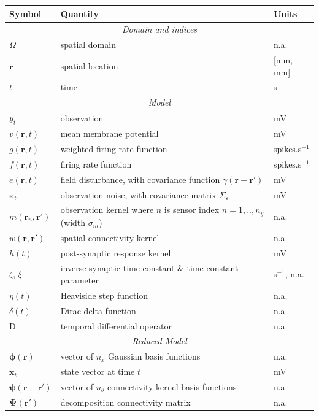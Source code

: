 \documentclass[review,authoryear,3p]{elsarticle}
\begin{document}
\begin{table}[!ht]
\begin{tabular}{|l|l|l|}
	\hline
	\textbf{Symbol} & \textbf{Quantity} & \textbf{Units}\\
	\hline
	\multicolumn{3}{|c|}{\emph{Domain and indices}}\\
	\hline
	$\Omega$ & spatial domain & n.a.\\
	$\mathbf{r}$ & spatial location & [mm, mm]\\
	$t$ & time & s\\
	\hline
	\multicolumn{3}{|c|}{\emph{Model}}\\
	\hline
    $y_t$ & observation & mV\\
    $v(\mathbf{r},t)$ & mean membrane potential & mV \\
	$g(\mathbf{r},t)$ & weighted firing rate function & spikes.s$^{-1}$\\
	$f(\mathbf{r},t)$ & firing rate function & spikes.s$^{-1}$\\
	$e(\mathbf{r},t)$ & field disturbance, with covariance function $\gamma(\mathbf r-\mathbf r')$ & mV\\
	$\boldsymbol\varepsilon_t$ & observation noise, with covariance matrix $\Sigma_\varepsilon$ & mV\\
	$m(\mathbf{r}_n,\mathbf{r}')$ & observation kernel where $n$ is sensor index $n=1,..,n_y$ (width $\sigma_m$) & n.a. \\
	$w(\mathbf{r},\mathbf{r}')$ & spatial connectivity kernel & n.a.\\
	$h(t)$ & post-synaptic response kernel & mV\\
	$\zeta$, $\xi$ & inverse synaptic time constant \& time constant parameter & s$^{-1}$, n.a.\\
	$\eta(t)$ & Heaviside step function & n.a.\\
	$\delta(t)$ & Dirac-delta function & n.a.\\
	$\textrm{D}$ & temporal differential operator & n.a.\\
	\hline
	\multicolumn{3}{|c|}{\emph{Reduced Model}} \\
	\hline
   	$\boldsymbol\phi(\mathbf{r})$ & vector of $n_x$ Gaussian basis functions & n.a.\\
   	$\mathbf{x}_t$ & state vector at time $t$ & mV\\
   	$\boldsymbol{\psi}(\mathbf{r}-\mathbf{r}')$ & vector of $n_{\theta}$ connectivity kernel basis functions & n.a.\\
   	$\boldsymbol{\Psi}(\mathbf{r}')$ & decomposition connectivity matrix & n.a.\\

\end{tabular}
\end{table}
\end{document}
